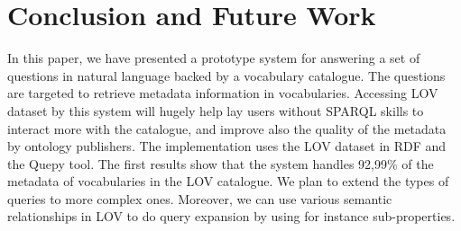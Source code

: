\documentclass[runningheads,a4paper]{llncs}
\newcommand{\todo}[1]{\noindent\textcolor{red}{{\bf \{TODO}: #1{\bf \}}}}
\begin{document}
\section{Conclusion and Future Work}
\label{sec:conclusion}
%

In this paper, we have presented a prototype system for answering a set of questions in natural language backed by a vocabulary catalogue. The questions are targeted to retrieve metadata information in vocabularies. Accessing LOV dataset by this system will hugely help lay users without SPARQL skills to interact more with the catalogue, and improve also the quality of the metadata by ontology publishers.  
The implementation uses the LOV dataset in RDF and the Quepy tool. The first results show that the system handles 92,99\% of the metadata of vocabularies in the LOV catalogue.
We plan to extend the types of queries to more complex ones. Moreover, we can use various semantic relationships in LOV to do query expansion by using for instance sub-properties. 






\end{document}
